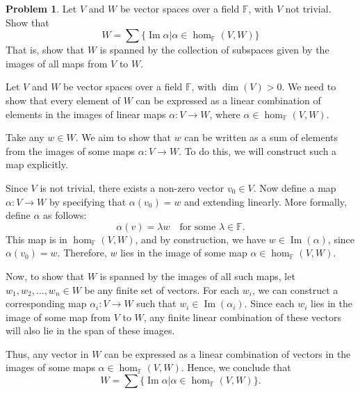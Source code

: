 \documentclass[12pt]{article}
\theoremstyle{definition}
\newtheorem{problem}{Problem}
\DeclareMathOperator{\Ima}{Im}
\begin{document}
\begin{problem}
    Let $V$ and $W$ be vector spaces over a field $\mathbb{F}$, with $V$ not trivial. Show that
    \[W = \sum\{\Ima \alpha | \alpha \in \hom_{\mathbb{F}}(V, W)\}\]
    That is, show that $W$ is spanned by the collection of subspaces given by the images of all maps from $V$ to $W$.
    
    \begin{solution}
        Let $V$ and $W$ be vector spaces over a field $\mathbb{F}$, with $\dim(V) > 0$. We need to show that every element of $W$ can be expressed as a linear combination of elements in the images of linear maps $\alpha: V \rightarrow W$, where $\alpha \in \hom_{\mathbb{F}}(V, W)$.

        Take any $w \in W$. We aim to show that $w$ can be written as a sum of elements from the images of some maps $\alpha: V \rightarrow W$. To do this, we will construct such a map explicitly.

        Since $V$ is not trivial, there exists a non-zero vector $v_0 \in V$. Now define a map $\alpha: V \rightarrow W$ by specifying that $\alpha(v_0) = w$ and extending linearly. More formally, define $\alpha$ as follows:
        \[
        \alpha(v) = \lambda w \quad \text{for some } \lambda \in \mathbb{F}.
        \]
        This map is in $\hom_{\mathbb{F}}(V, W)$, and by construction, we have $w \in \Ima(\alpha)$, since $\alpha(v_0) = w$. Therefore, $w$ lies in the image of some map $\alpha \in \hom_{\mathbb{F}}(V, W)$.

        Now, to show that $W$ is spanned by the images of all such maps, let $w_1, w_2, \ldots, w_n \in W$ be any finite set of vectors. For each $w_i$, we can construct a corresponding map $\alpha_i: V \rightarrow W$ such that $w_i \in \Ima(\alpha_i)$. Since each $w_i$ lies in the image of some map from $V$ to $W$, any finite linear combination of these vectors will also lie in the span of these images.

        Thus, any vector in $W$ can be expressed as a linear combination of vectors in the images of some maps $\alpha \in \hom_{\mathbb{F}}(V, W)$. Hence, we conclude that
        \[
        W = \sum\{\Ima \alpha | \alpha \in \hom_{\mathbb{F}}(V, W)\}.
        \]

    \end{solution}
\end{problem}
\end{document}
